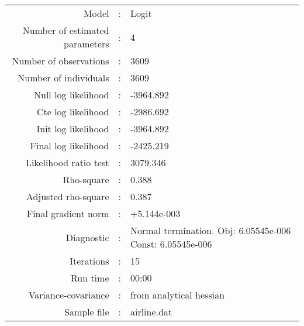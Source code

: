 

\begin{flushleft}
\begin{tabular}{rcl}
\hline
Model &:& Logit\\
Number of estimated parameters&:&4\\
Number of  observations &:& 3609\\
Number of individuals&:&3609\\
Null log likelihood&:&-3964.892\\
Cte log likelihood&:&-2986.692\\
Init log likelihood&:&-3964.892\\
Final log likelihood&:&-2425.219\\
Likelihood ratio test &:&3079.346\\
Rho-square&:&0.388\\
Adjusted rho-square&:&0.387\\
Final gradient norm&:&+5.144e-003\\
Diagnostic&:&Normal termination. Obj: 6.05545e-006 Const: 6.05545e-006\\
Iterations&:&15\\
Run time&:&00:00\\
Variance-covariance&:&from analytical hessian
\\
Sample file&:&airline.dat\\
\end{tabular}
\end{flushleft}
